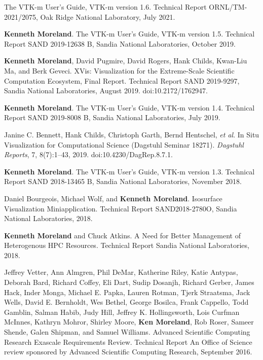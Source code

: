 \begin{enumerate}[label={[\arabic*]}, left=0pt]
  The {VTK-m} User's Guide, {VTK-m} version 1.6.
Technical Report ORNL/TM-2021/2075, Oak Ridge National Laboratory, July 2021.
\item  %
  \textbf{Kenneth Moreland}.
  The {VTK-m} User's Guide, {VTK-m} version 1.5.
Technical Report SAND 2019-12638 B, Sandia National Laboratories, October 2019.
\item  %
  \textbf{Kenneth Moreland}, David Pugmire, David Rogers, Hank Childs, Kwan-Liu Ma, and Berk Geveci.
  {XVis}: Visualization for the Extreme-Scale Scientific Computation Ecosystem, Final Report.
Technical Report SAND 2019-9297, Sandia National Laboratories, August 2019.
  doi:10.2172/1762947.
\item  %
  \textbf{Kenneth Moreland}.
  The {VTK-m} User's Guide, {VTK-m} version 1.4.
Technical Report SAND 2019-8008 B, Sandia National Laboratories, July 2019.
\item  %
  Janine C. Bennett, Hank Childs, Christoph Garth, Bernd Hentschel, \emph{et al}.
  In Situ Visualization for Computational Science (Dagstuhl Seminar 18271).
  \emph{Dagstuhl Reports}, 7, 8(7):1--43, 2019.
  doi:10.4230/DagRep.8.7.1.
\item  %
  \textbf{Kenneth Moreland}.
  The {VTK-m} User's Guide, {VTK-m} version 1.3.
Technical Report SAND 2018-13465 B, Sandia National Laboratories, November 2018.
\item  %
  Daniel Bourgeois, Michael Wolf, and \textbf{Kenneth Moreland}.
  Isosurface Visualization Miniapplication.
Technical Report SAND2018-2780O, Sandia National Laboratories, 2018.
\item  %
  \textbf{Kenneth Moreland} and Chuck Atkins.
  A Need for Better Management of Heterogenous HPC Resources.
Technical Report Sandia National Laboratories, 2018.
\item  %
  Jeffrey Vetter, Ann Almgren, Phil DeMar, Katherine Riley, Katie Antypas, Deborah Bard, Richard Coffey, Eli Dart, Sudip Dosanjh, Richard Gerber, James Hack, Inder Monga, Michael E. Papka, Lauren Rotman, Tjerk Straatsma, Jack Wells, David E. Bernholdt, Wes Bethel, George Bosilca, Frank Cappello, Todd Gamblin, Salman Habib, Judy Hill, Jeffrey K. Hollingsworth, Lois Curfman McInnes, Kathryn Mohror, Shirley Moore, \textbf{Ken Moreland}, Rob Roser, Sameer Shende, Galen Shipman, and Samuel Williams.
  Advanced Scientific Computing Research Exascale Requirements Review.
Technical Report An Office of Science review sponsored by Advanced Scientific Computing Research, September 2016.

\end{enumerate}
